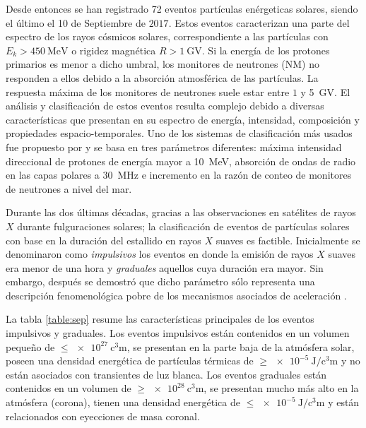 Desde entonces se han registrado \num{72} eventos partículas enérgeticas solares, siendo el último el \num{10} de Septiembre de $2017$. Estos eventos caracterizan una parte del espectro de los rayos cósmicos solares, correspondiente a las partículas con $E_{k}>\SI{450}{\mega\electronvolt}$ o rigidez magnética $R> \SI{1}{\giga\volt}$. Si la energía de los protones primarios es menor a dicho umbral, los monitores de neutrones (NM) no responden a ellos debido a la absorción atmosférica de las partículas. La respuesta máxima de los monitores de neutrones suele estar entre $1$ y \SI{5}{\giga\volt}. El análisis y clasificación de estos eventos resulta complejo debido a diversas características que presentan en su espectro de energía, intensidad, composición y propiedades espacio-temporales. Uno de los sistemas de clasificación más usados fue propuesto por \cite{shea71} y se basa en tres parámetros diferentes: máxima intensidad direccional de protones de energía mayor a \SI{10}{\mega\electronvolt}, absorción de ondas de radio en las capas polares a \SI{30}{\mega\hertz} e incremento en la razón de conteo de monitores de neutrones a nivel del mar.

Durante las dos últimas décadas, gracias a las observaciones en satélites de rayos $X$ durante fulguraciones solares; la clasificación de eventos de partículas solares con base en la duración del estallido en rayos $X$ suaves es factible. Inicialmente se denominaron como \emph{impulsivos} los eventos en donde la emisión de rayos $X$ suaves era menor de una hora y \emph{graduales} aquellos cuya duración era mayor. Sin embargo, después se demostró que dicho parámetro sólo representa una descripción fenomenológica pobre de los mecanismos asociados de aceleración \cite{reames96}.

La tabla \ref{table:sep} resume las características principales de los eventos impulsivos y graduales. Los eventos impulsivos están contenidos en un volumen pequeño de $\leq\SI{e27}{\cubic\centi\metre}$, se presentan en la parte baja de la atmósfera solar, poseen una densidad energética de partículas térmicas de $\geq\SI{e-5}{\joule\per\cubic\centi\metre}$ y no están asociados con transientes de luz blanca. Los eventos graduales están contenidos en un volumen de $\geq\SI{e28}{\cubic\centi\metre}$, se presentan mucho más alto en la atmósfera (corona), tienen una densidad energética de $\leq\SI{e-5}{\joule\per\cubic\centi\metre}$ y están relacionados con eyecciones de masa coronal.


